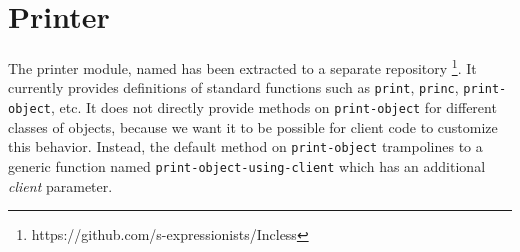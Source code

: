 \chapter{Printer}

The printer module, named \incless{} has been extracted to a separate
repository%
\footnote{https://github.com/s-expressionists/Incless}.
It currently provides definitions of standard functions such as
\texttt{print}, \texttt{princ}, \texttt{print-object}, etc.  It does
not directly provide methods on \texttt{print-object} for different
classes of objects, because we want it to be possible for client code
to customize this behavior.  Instead, the default method on
\texttt{print-object} trampolines to a generic function named
\texttt{print-object-using-client} which has an additional
\emph{client} parameter.

